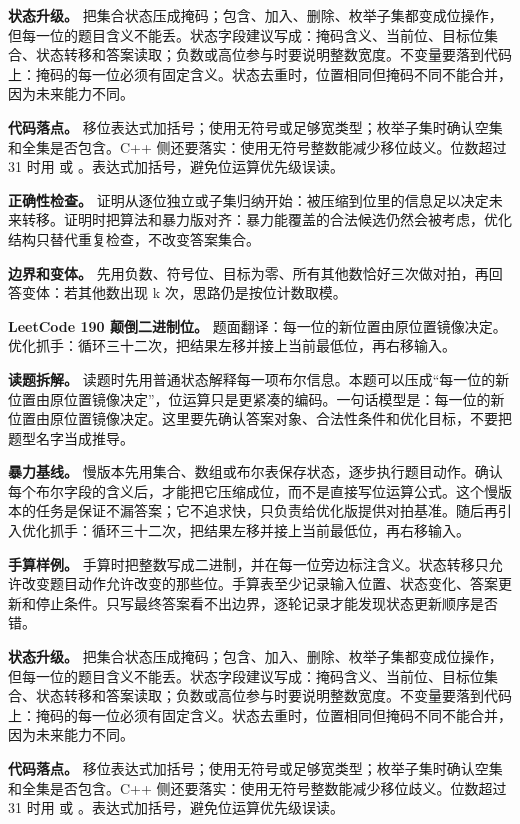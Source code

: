\textbf{状态升级。} 把集合状态压成掩码；包含、加入、删除、枚举子集都变成位操作，但每一位的题目含义不能丢。状态字段建议写成：掩码含义、当前位、目标位集合、状态转移和答案读取；负数或高位参与时要说明整数宽度。不变量要落到代码上：掩码的每一位必须有固定含义。状态去重时，位置相同但掩码不同不能合并，因为未来能力不同。

\textbf{代码落点。} 移位表达式加括号；使用无符号或足够宽类型；枚举子集时确认空集和全集是否包含。C++ 侧还要落实：使用无符号整数能减少移位歧义。位数超过 31 时用  或 。表达式加括号，避免位运算优先级误读。

\textbf{正确性检查。} 证明从逐位独立或子集归纳开始：被压缩到位里的信息足以决定未来转移。证明时把算法和暴力版对齐：暴力能覆盖的合法候选仍然会被考虑，优化结构只替代重复检查，不改变答案集合。

\textbf{边界和变体。} 先用负数、符号位、目标为零、所有其他数恰好三次做对拍，再回答变体：若其他数出现 k 次，思路仍是按位计数取模。

\noindent\textbf{LeetCode 190 颠倒二进制位。} 题面翻译：每一位的新位置由原位置镜像决定。优化抓手：循环三十二次，把结果左移并接上当前最低位，再右移输入。

\textbf{读题拆解。} 读题时先用普通状态解释每一项布尔信息。本题可以压成“每一位的新位置由原位置镜像决定”，位运算只是更紧凑的编码。一句话模型是：每一位的新位置由原位置镜像决定。这里要先确认答案对象、合法性条件和优化目标，不要把题型名字当成推导。

\textbf{暴力基线。} 慢版本先用集合、数组或布尔表保存状态，逐步执行题目动作。确认每个布尔字段的含义后，才能把它压缩成位，而不是直接写位运算公式。这个慢版本的任务是保证不漏答案；它不追求快，只负责给优化版提供对拍基准。随后再引入优化抓手：循环三十二次，把结果左移并接上当前最低位，再右移输入。

\textbf{手算样例。} 手算时把整数写成二进制，并在每一位旁边标注含义。状态转移只允许改变题目动作允许改变的那些位。手算表至少记录输入位置、状态变化、答案更新和停止条件。只写最终答案看不出边界，逐轮记录才能发现状态更新顺序是否错。

\textbf{状态升级。} 把集合状态压成掩码；包含、加入、删除、枚举子集都变成位操作，但每一位的题目含义不能丢。状态字段建议写成：掩码含义、当前位、目标位集合、状态转移和答案读取；负数或高位参与时要说明整数宽度。不变量要落到代码上：掩码的每一位必须有固定含义。状态去重时，位置相同但掩码不同不能合并，因为未来能力不同。

\textbf{代码落点。} 移位表达式加括号；使用无符号或足够宽类型；枚举子集时确认空集和全集是否包含。C++ 侧还要落实：使用无符号整数能减少移位歧义。位数超过 31 时用  或 。表达式加括号，避免位运算优先级误读。

